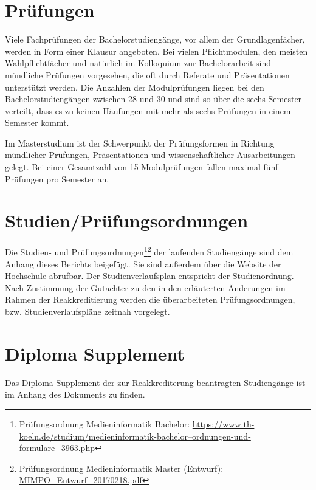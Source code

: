 \section{Prüfungen}\label{pruxfcfungen}

Viele Fachprüfungen der Bachelorstudiengänge, vor allem der
Grundlagenfächer, werden in Form einer Klausur angeboten. Bei vielen
Pflichtmodulen, den meisten Wahlpflichtfächer und natürlich im
Kolloquium zur Bachelorarbeit sind mündliche Prüfungen vorgesehen, die
oft durch Referate und Präsentationen unterstützt werden. Die Anzahlen
der Modulprüfungen liegen bei den Bachelorstudiengängen zwischen 28 und
30 und sind so über die sechs Semester verteilt, dass es zu keinen
Häufungen mit mehr als sechs Prüfungen in einem Semester kommt.

Im Masterstudium ist der Schwerpunkt der Prüfungsformen in Richtung
mündlicher Prüfungen, Präsentationen und wissenschaftlicher
Ausarbeitungen gelegt. Bei einer Gesamtzahl von 15 Modulprüfungen fallen
maximal fünf Prüfungen pro Semester an.

\section{Studien/Prüfungsordnungen}\label{studienpruxfcfungsordnungen}

Die Studien- und Prüfungsordnungen\footnote{Prüfungsordnung
  Medieninformatik Bachelor:
  \href{https://www.th-koeln.de/studium/medieninformatik-bachelor--ordnungen-und-formulare_3963.php}{https://www.th-koeln.de/studium/medieninformatik-bachelor--ordnungen-und-formulare\_3963.php}}\footnote{Prüfungsordnung
  Medieninformatik Master (Entwurf):
  \href{../anhaenge/MIMPO_Entwurf_20170218.pdf}{MIMPO\_Entwurf\_20170218.pdf}}
der laufenden Studiengänge sind dem Anhang dieses Berichts beigefügt.
Sie sind außerdem über die Website der Hochschule abrufbar. Der
Studienverlaufsplan entspricht der Studienordnung. Nach Zustimmung der
Gutachter zu den in den erläuterten Änderungen im Rahmen der
Reakkreditierung werden die überarbeiteten Prüfungsordnungen, bzw.
Studienverlaufspläne zeitnah vorgelegt.

\section{Diploma Supplement}\label{diploma-supplement}

Das Diploma Supplement der zur Reakkrediterung beantragten Studiengänge
ist im Anhang des Dokuments zu finden.

